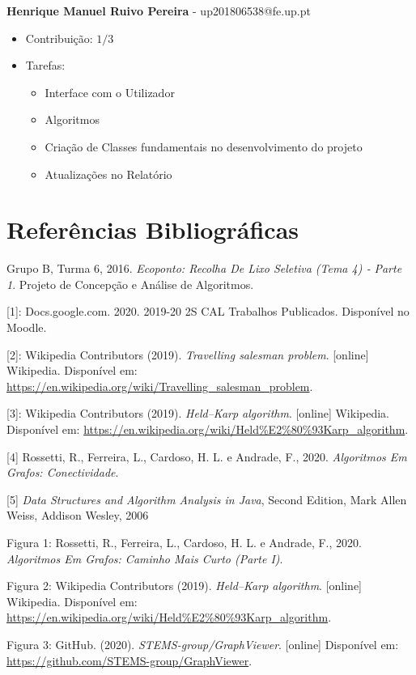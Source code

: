 \documentclass[article, a4paper, 12pt, oneside]{memoir}
\begin{document}
\textbf{Henrique Manuel Ruivo Pereira} - up201806538@fe.up.pt

\begin{itemize}
\item Contribuição: $1/3$
\item Tarefas:
	\begin{itemize}
	\item Interface com o Utilizador
	\item Algoritmos
	\item Criação de Classes fundamentais no desenvolvimento do projeto
	\item Atualizações no Relatório
	\end{itemize}
\end{itemize}


\newpage
\chapter[Referências Bibliográficas][Referências Bibliográficas]{Referências Bibliográficas} \label{\thechapter}
Grupo B, Turma 6, 2016. \textit{Ecoponto: Recolha De Lixo Seletiva (Tema 4) ‐ Parte 1}. Projeto de Concepção e Análise de Algoritmos.

[1]: Docs.google.com. 2020. 2019-20 2S CAL Trabalhos Publicados. Disponível no Moodle.

[2]: Wikipedia Contributors (2019). \textit{Travelling salesman problem}. [online] Wikipedia. Disponível em: \url{https://en.wikipedia.org/wiki/Travelling_salesman_problem}.

[3]: Wikipedia Contributors (2019). \textit{Held–Karp algorithm}. [online] Wikipedia. Disponível em: \url{https://en.wikipedia.org/wiki/Held%E2%80%93Karp_algorithm}.

[4] Rossetti, R., Ferreira, L., Cardoso, H. L. e Andrade, F., 2020. \textit{Algoritmos Em Grafos: Conectividade}.

[5] \textit{Data Structures and Algorithm Analysis in Java}, Second
Edition, Mark Allen Weiss, Addison Wesley, 2006 

Figura 1: Rossetti, R., Ferreira, L., Cardoso, H. L. e Andrade, F., 2020. \textit{Algoritmos Em Grafos: Caminho Mais Curto (Parte I)}.

Figura 2: Wikipedia Contributors (2019). \textit{Held–Karp algorithm}. [online] Wikipedia. Disponível em: \url{https://en.wikipedia.org/wiki/Held%E2%80%93Karp_algorithm}.

Figura 3: GitHub. (2020). \textit{STEMS-group/GraphViewer}. [online] Disponível em: \url{https://github.com/STEMS-group/GraphViewer}.

‌

‌

\newpage
\end{document}
